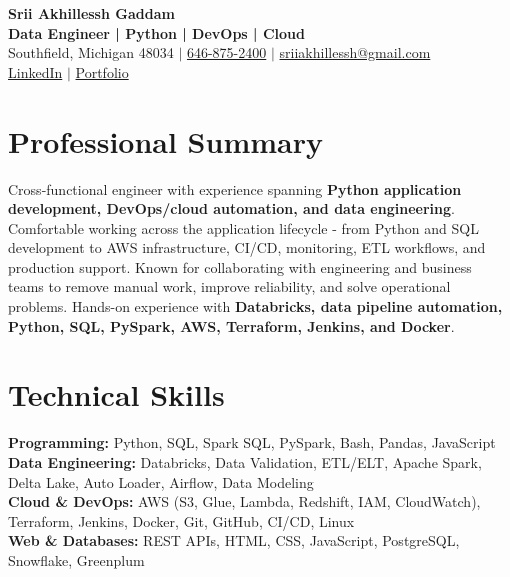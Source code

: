 \documentclass[letterpaper,10pt]{article}
\begin{document}
\fontsize{9.35pt}{10.45pt}\selectfont

\begin{center}
    {\LARGE \textbf{Srii Akhillessh Gaddam}} \\[-1pt]
    \textbf{Data Engineer | Python | DevOps | Cloud} \\[2pt]
    Southfield, Michigan 48034 $|$
    \href{tel:6468752400}{646-875-2400} $|$
    \href{mailto:sriiakhillessh@gmail.com}{sriiakhillessh@gmail.com} \\[1pt]
    \href{https://www.linkedin.com/in/srii-akhiilessh-gaddam-b48668191/}{LinkedIn} $|$
    \href{https://sriiakhillesshg.github.io/portfolio/}{Portfolio}
\end{center}
\vspace{-8pt}

\section{Professional Summary}
\small{Cross-functional engineer with experience spanning \textbf{Python application development, DevOps/cloud automation, and data engineering}. Comfortable working across the application lifecycle - from Python and SQL development to AWS infrastructure, CI/CD, monitoring, ETL workflows, and production support. Known for collaborating with engineering and business teams to remove manual work, improve reliability, and solve operational problems. Hands-on experience with \textbf{Databricks, data pipeline automation, Python, SQL, PySpark, AWS, Terraform, Jenkins, and Docker}.}

\section{Technical Skills}
\small{
\textbf{Programming:} Python, SQL, Spark SQL, PySpark, Bash, Pandas, JavaScript \\
\textbf{Data Engineering:} Databricks, Data Validation, ETL/ELT, Apache Spark, Delta Lake, Auto Loader, Airflow, Data Modeling \\
\textbf{Cloud \& DevOps:} AWS (S3, Glue, Lambda, Redshift, IAM, CloudWatch), Terraform, Jenkins, Docker, Git, GitHub, CI/CD, Linux \\
\textbf{Web \& Databases:} REST APIs, HTML, CSS, JavaScript, PostgreSQL, Snowflake, Greenplum
}

\end{document}
